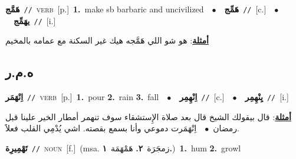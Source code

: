 \documentclass[10pt,a4paper,twoside]{article} %
\begin{document}
\begin{multicols}{2}
{\setlength\topsep{0pt}\textbf{\foreignlanguage{arabic}{هَمَّج}}\ {\color{gray}\texttt{//}\color{black}}\ \textsc{verb}\ [p.]\ \textbf{1.}~make sb barbaric and uncivilized\ \ $\bullet$\ \ \setlength\topsep{0pt}\textbf{\foreignlanguage{arabic}{هَمِّج}}\ {\color{gray}\texttt{//}\color{black}}\ [c.]\ \ $\bullet$\ \ \setlength\topsep{0pt}\textbf{\foreignlanguage{arabic}{يهَمِّج}}\ {\color{gray}\texttt{//}\color{black}}\ [i.]\  \begin{flushright}\color{gray}\foreignlanguage{arabic}{\textbf{\underline{\foreignlanguage{arabic}{أمثلة}}}: هو شو اللي هَمَّجه هيك غير السكنة مع عمامه بالمخيم}\end{flushright}\color{black}} \vspace{2mm}

\vspace{-3mm}
\subsection*{\color{blue}\foreignlanguage{arabic}{ه.م.ر}\color{blue}{}} 

{\setlength\topsep{0pt}\textbf{\foreignlanguage{arabic}{اِنْهَمَر}}\ {\color{gray}\texttt{//}\color{black}}\ \textsc{verb}\ [p.]\ \textbf{1.}~pour  \textbf{2.}~rain  \textbf{3.}~fall\ \ $\bullet$\ \ \setlength\topsep{0pt}\textbf{\foreignlanguage{arabic}{اِنْهِمِر}}\ {\color{gray}\texttt{//}\color{black}}\ [c.]\ \ $\bullet$\ \ \setlength\topsep{0pt}\textbf{\foreignlanguage{arabic}{يِنْهِمِر}}\ {\color{gray}\texttt{//}\color{black}}\ [i.]\  \begin{flushright}\color{gray}\foreignlanguage{arabic}{\textbf{\underline{\foreignlanguage{arabic}{أمثلة}}}: قال بيقولك الشيخ قال بعد صلاة الإِستشقاء سوف تنهمر أمطار الخير علينا قبل رمضان\ $\bullet$\ \  اِنْهَمَرت دموعي وأنا بسمع بقصته. اشي يُدْمِي القلب فعلاََ.}\end{flushright}\color{black}} \vspace{2mm}

{\setlength\topsep{0pt}\textbf{\foreignlanguage{arabic}{تَهْمِيرِة}}\ {\color{gray}\texttt{//}\color{black}}\ \textsc{noun}\ [f.]\ \color{gray}(msa. \foreignlanguage{arabic}{زمجَرَة}~\foreignlanguage{arabic}{\textbf{٢.}}  \foreignlanguage{arabic}{هَمْهَمَة}~\foreignlanguage{arabic}{\textbf{١.}})\color{black}\ \textbf{1.}~hum  \textbf{2.}~growl\ } \vspace{2mm}


\end{multicols}
\end{document}
